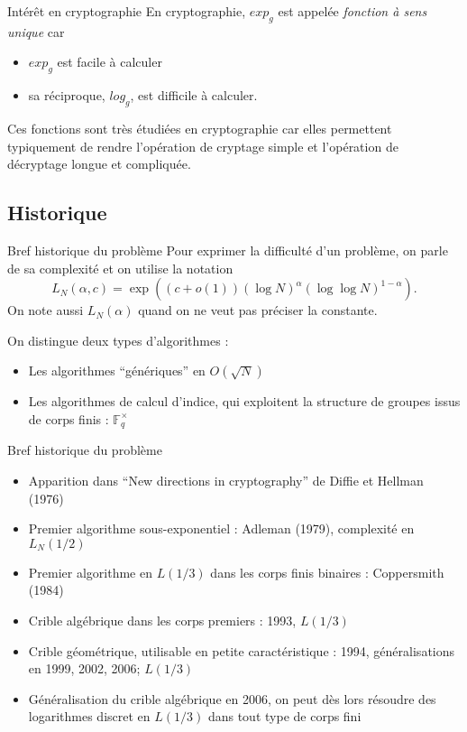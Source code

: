 \documentclass[xcolor=x11names,compress]{beamer}
\theoremstyle{break}
\theoremstyle{sc}
\theoremstyle{definition}
\theoremstyle{remark}
\begin{document}
\begin{frame}{Intérêt en cryptographie}
  En cryptographie, $exp_g$ est appelée \emph{fonction à sens unique} car
  \begin{itemize}
    \item $exp_g$ est facile à calculer
    \item sa réciproque, $log_g$, est difficile à calculer.
  \end{itemize}

  Ces fonctions sont très étudiées en cryptographie car elles permettent
  typiquement de rendre l'opération de cryptage simple et l'opération de
  décryptage longue et compliquée.
\end{frame}

\subsection{Historique}
\begin{frame}{Bref historique du problème}
  Pour exprimer la difficulté d'un problème, on parle de sa complexité et on
  utilise la notation 
  \[
    L_N(\alpha, c) = \exp((c+o(1))(\log N)^\alpha(\log\log N)^{1-\alpha}).
  \]
  On note aussi $L_N(\alpha)$ quand on ne veut pas préciser la constante.

  On distingue deux types d'algorithmes :
  \begin{itemize}
    \item Les algorithmes ``génériques'' en $O(\sqrt N)$
    \item Les algorithmes de calcul d'indice, qui exploitent la structure de
      groupes issus de corps finis : $\mathbb{F}_{q}^\times$
  \end{itemize}
\end{frame}

\begin{frame}{Bref historique du problème}
  \begin{itemize}
    \item Apparition dans ``New directions in cryptography'' de Diffie et
      Hellman (1976)
    \item Premier algorithme sous-exponentiel : Adleman (1979), complexité en
      $L_N(1/2)$
  \item Premier algorithme en $L(1/3)$ dans les corps finis binaires : Coppersmith (1984)
  \item Crible algébrique dans les corps premiers : 1993,
    $L(1/3)$
  \item Crible géométrique, utilisable en petite caractéristique : 1994,
    généralisations en 1999, 2002, 2006; $L(1/3)$
  \item Généralisation du crible algébrique en 2006, on peut dès lors résoudre
    des logarithmes discret en $L(1/3)$ dans tout type de corps fini
  \end{itemize}
\end{frame}
\end{document}
